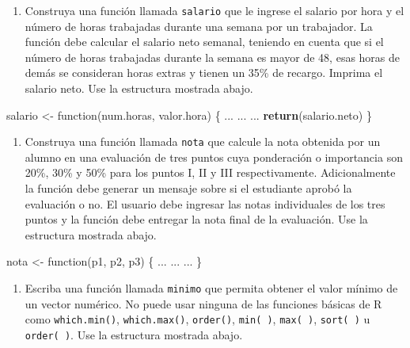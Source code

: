 \documentclass[10pt,]{krantz}
\makeatletter
\newenvironment{Shaded}{\begin{snugshade}}{\end{snugshade}}
\newcommand{\KeywordTok}[1]{\textcolor[rgb]{0.13,0.29,0.53}{\textbf{{#1}}}}
\newcommand{\StringTok}[1]{\textcolor[rgb]{0.31,0.60,0.02}{{#1}}}
\newcommand{\NormalTok}[1]{{#1}}
\providecommand{\tightlist}{%
  \setlength{\itemsep}{0pt}\setlength{\parskip}{0pt}}
\newenvironment{kframe}{%
\medskip{}
\setlength{\fboxsep}{.8em}
 \def\at@end@of@kframe{}%
 \ifinner\ifhmode%
  \def\at@end@of@kframe{\end{minipage}}%
  \begin{minipage}{\columnwidth}%
 \fi\fi%
 \def\FrameCommand##1{\hskip\@totalleftmargin \hskip-\fboxsep
 \colorbox{shadecolor}{##1}\hskip-\fboxsep
     \hskip-\linewidth \hskip-\@totalleftmargin \hskip\columnwidth}%
 \MakeFramed {\advance\hsize-\width
   \@totalleftmargin\z@ \linewidth\hsize
   \@setminipage}}%
 {\par\unskip\endMakeFramed%
 \at@end@of@kframe}
\renewenvironment{Shaded}{\begin{kframe}}{\end{kframe}}
\makeatother
\begin{document}
\begin{enumerate}
\def\labelenumi{\arabic{enumi}.}
\setcounter{enumi}{8}
\tightlist
\item
  Construya una función llamada \texttt{salario} que le ingrese el
  salario por hora y el número de horas trabajadas durante una semana
  por un trabajador. La función debe calcular el salario neto semanal,
  teniendo en cuenta que si el número de horas trabajadas durante la
  semana es mayor de 48, esas horas de demás se consideran horas extras
  y tienen un 35\% de recargo. Imprima el salario neto. Use la
  estructura mostrada abajo.
\end{enumerate}

\begin{Shaded}
\begin{Highlighting}[]
\NormalTok{salario <-}\StringTok{ }\NormalTok{function(num.horas, valor.hora) \{}
  \NormalTok{...}
  \NormalTok{...}
  \NormalTok{...}
  \KeywordTok{return}\NormalTok{(salario.neto)}
\NormalTok{\}}
\end{Highlighting}
\end{Shaded}

\begin{enumerate}
\def\labelenumi{\arabic{enumi}.}
\setcounter{enumi}{9}
\tightlist
\item
  Construya una función llamada \texttt{nota} que calcule la nota
  obtenida por un alumno en una evaluación de tres puntos cuya
  ponderación o importancia son 20\%, 30\% y 50\% para los puntos I, II
  y III respectivamente. Adicionalmente la función debe generar un
  mensaje sobre si el estudiante aprobó la evaluación o no. El usuario
  debe ingresar las notas individuales de los tres puntos y la función
  debe entregar la nota final de la evaluación. Use la estructura
  mostrada abajo.
\end{enumerate}

\begin{Shaded}
\begin{Highlighting}[]
\NormalTok{nota <-}\StringTok{ }\NormalTok{function(p1, p2, p3) \{}
  \NormalTok{...}
  \NormalTok{...}
  \NormalTok{...}
\NormalTok{\}}
\end{Highlighting}
\end{Shaded}

\begin{enumerate}
\def\labelenumi{\arabic{enumi}.}
\setcounter{enumi}{10}
\tightlist
\item
  Escriba una función llamada \texttt{minimo} que permita obtener el
  valor mínimo de un vector numérico. No puede usar ninguna de las
  funciones básicas de R como \texttt{which.min()},
  \texttt{which.max()}, \texttt{order()}, \texttt{min(\ )},
  \texttt{max(\ )}, \texttt{sort(\ )} u \texttt{order(\ )}. Use la
  estructura mostrada abajo.
\end{enumerate}
\end{document}

